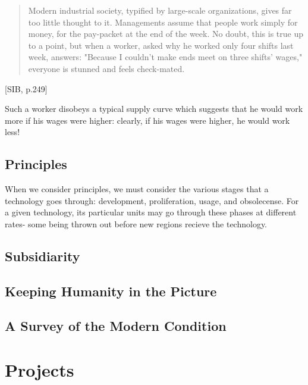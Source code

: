 \documentclass[letterpaper]{article}
\begin{document}
\begin{quote}
  Modern industrial society, typified by large-scale organizations, gives far too little thought to it. Managements assume that people work simply for money, for the pay-packet at the end of the week. No doubt, this is true up to a point, but when a worker, asked why he worked only four shifts last week, answers: "Because I couldn't make ends meet on three shifts' wages," everyone is stunned and feels check-mated.
\end{quote}[SIB, p.249]

Such a worker disobeys a typical supply curve which suggests that he would work more if his wages were higher: clearly, if his wages were higher, he would work less!

\subsection{Principles}

When we consider principles, we must consider the various stages that a technology goes through: development, proliferation, usage, and obsolecense. For a given technology, its particular units may go through these phases at different rates- some being thrown out before new regions recieve the technology.

\subsection{Subsidiarity}

\subsection{Keeping Humanity in the Picture}

\subsection{A Survey of the Modern Condition}

\section{Projects}
\end{document}

